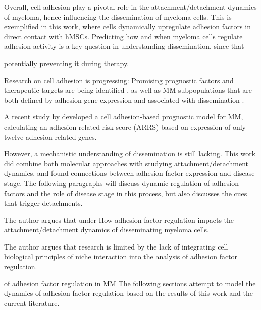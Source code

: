 \label{sec:discussion_order_adhesion}%
Overall, cell adhesion play a pivotal role in the attachment/detachment dynamics of
myeloma, hence influencing the dissemination of myeloma cells. This is
exemplified in this work, where \INA cells dynamically upregulate adhesion
factors in direct contact with \acp{hMSC}. Predicting how and when myeloma cells
regulate adhesion activity is a key question in understanding dissemination,
since that

potentially preventing it during therapy.

Research on cell adhesion is progressing:
Promising prognostic factors and therapeutic targets are being identified
\cite{mrozikTherapeuticTargetingNcadherin2015,
      solimandoJAMAPrognosticFactor2018}, as well as MM subpopulations that are both
defined by adhesion gene expression and associated with dissemination
\cite{akhmetzyanovaDynamicCD138Surface2020,
      brandlJunctionalAdhesionMolecule2022}.


A recent study by \citet{huDevelopmentCellAdhesionbased2024} developed a cell
adhesion-based prognostic model for MM, calculating an adhesion-related risk
score (ARRS) based on expression of only twelve adhesion related genes.

However, a mechanistic understanding of dissemination is still lacking. This
work did combine both molecular approaches with studying attachment/detachment
dynamics, and found connections between adhesion factor expression and disease
stage. The following paragraphs will discuss dynamic regulation of adhesion factors
and the role of disease stage in this process, but also discusses the cues that trigger
detachments.


The author argues that under
How adhesion
factor regulation impacts the attachment/detachment dynamics of disseminating
myeloma cells.

The author argues that research
is limited by the lack of integrating cell biological principles of niche
interaction into the analysis of adhesion factor regulation.


of adhesion factor regulation in MM
The following sections attempt to model the dynamics of adhesion factor
regulation based on the results of this work and the current literature.






